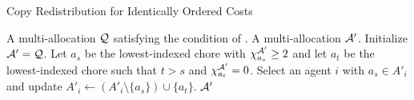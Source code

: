 \begin{algorithm}
\caption{Copy Redistribution for Identically Ordered Costs}\label{alg:chores-shifting-2}

\begin{algorithmic}[1]
    \REQUIRE A multi-allocation $\mathcal{Q}$ satisfying the condition of .
    \ENSURE A multi-allocation $\mathcal{A}'$.
    \STATE Initialize $\mathcal{A}'=\mathcal{Q}$.
    \STATE Let $a_s$ be the lowest-indexed chore with $\chi^{\mathcal{A}'}_{a_s}\geq 2$ and let $a_t$ be the lowest-indexed chore such that $t > s$ and $\chi^{\mathcal{A}'}_{a_t} = 0$. \label{line:lowchore}
    \STATE Select an agent $i$ with $a_s\in A'_i$ and update $A'_i \leftarrow (A'_i \setminus \{a_s \} ) \cup \{a_t\}$.
    \ENDWHILE
    \RETURN $\mathcal{A}'$
\end{algorithmic}
\end{algorithm}

